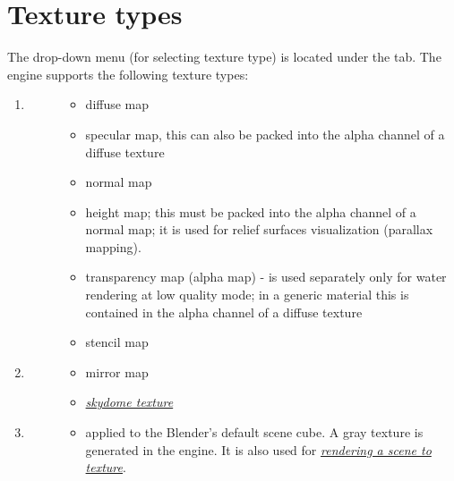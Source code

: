 \documentclass[a4paper,12pt,oneside]{sphinxmanual}
\begin{document}
\section{Texture types}
\label{textures:id2}\label{textures:index-1}
The  drop-down menu (for selecting texture type) is located under the  tab. The engine supports the following texture types:
\begin{enumerate}
\item {} \begin{description}
\item[{}] \leavevmode\begin{itemize}
\item {} 
diffuse map

\item {} 
specular map, this can also be packed into the alpha channel of a diffuse texture

\item {} 
normal map

\item {} 
height map; this must be packed into the alpha channel of a normal map; it is used for relief surfaces visualization (parallax mapping).

\item {} 
transparency map (alpha map) - is used separately only for water rendering at low quality mode; in a generic material this is contained in the alpha channel of a diffuse texture

\item {} 
stencil map

\end{itemize}

\end{description}

\item {} \begin{description}
\item[{}] \leavevmode\begin{itemize}
\item {} 
mirror map

\item {} 
{\hyperref[textures:skydome-texture]{\emph{skydome texture}}}

\end{itemize}

\end{description}

\item {} \begin{description}
\item[{}] \leavevmode\begin{itemize}
\item {} 
applied to the Blender's default scene cube. A gray texture is generated in the engine. It is also used for {\hyperref[textures:render-to-texture]{\emph{rendering a scene to texture}}}.


\end{itemize}
\end{description}
\end{enumerate}
\end{document}
